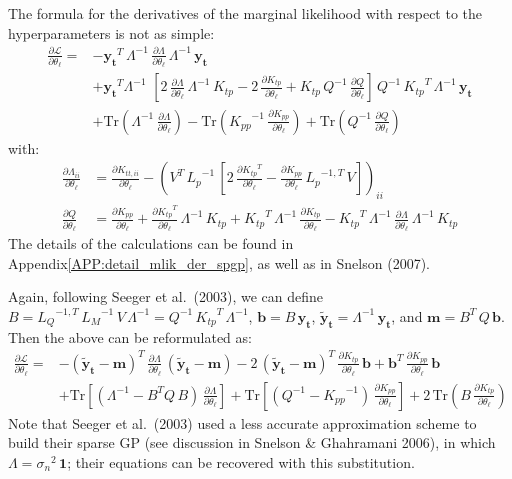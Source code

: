 \documentclass[11pt,a4paper]{article}
\newcommand\rapp[1]{Appendix\;\ref{#1}}
\newcommand{\tr}{\text{Tr}}
\numberwithin{equation}{section}
\begin{document}
The formula for the derivatives of the marginal likelihood with respect to the hyperparameters is not as simple:
\begin{align}
\frac{\partial \mathcal{L}}{\partial \theta_\ell} =
  &-\mathbf{y_t}^T\,\Lambda^{-1}\,\frac{\partial \Lambda}{\partial \theta_\ell}\,\Lambda^{-1}\,\mathbf{y_t} \nonumber \\
  &+\mathbf{y_t}^T\Lambda^{-1}\,\,\left[2\,\frac{\partial \Lambda}{\partial \theta_\ell}\,\Lambda^{-1}\,K_{tp} - 2\,\frac{\partial K_{tp}}{\partial \theta_\ell} + K_{tp}\,Q^{-1}\,\frac{\partial Q}{\partial \theta_\ell}\right]\,Q^{-1}\,{K_{tp}}^T\,\Lambda^{-1}\,\mathbf{y_t} \nonumber \\
  &+\tr\left(\Lambda^{-1}\,\frac{\partial \Lambda}{\partial \theta_\ell}\right) - \tr\left({K_{pp}}^{-1}\,\frac{\partial K_{pp}}{\partial \theta_\ell}\right) + \tr\left(Q^{-1}\,\frac{\partial Q}{\partial \theta_\ell}\right)
\end{align}
with:
\begin{align}
\frac{\partial \Lambda_{ii}}{\partial \theta_\ell} &= \frac{\partial K_{tt,ii}}{\partial \theta_\ell} - \left(V^T\,{L_p}^{-1}\,\left[2\,\frac{\partial {K_{tp}}^T}{\partial \theta_\ell} - \frac{\partial K_{pp}}{\partial \theta_\ell}\,{L_{p}}^{-1,T}\,V\right]\right)_{ii} \\
\frac{\partial Q}{\partial \theta_\ell} &= \frac{\partial K_{pp}}{\partial \theta_\ell} + \frac{\partial {K_{tp}}^T}{\partial \theta_\ell}\,\Lambda^{-1}\,K_{tp} + {K_{tp}}^T\,\Lambda^{-1}\,\frac{\partial K_{tp}}{\partial \theta_\ell} - {K_{tp}}^T\,\Lambda^{-1}\,\frac{\partial \Lambda}{\partial \theta_\ell}\,\Lambda^{-1}\,K_{tp}
\end{align}
The details of the calculations can be found in \rapp{APP:detail_mlik_der_spgp}, as well as in Snelson (2007).

Again, following Seeger et al.~(2003), we can define $B = {L_Q}^{-1,T}\,{L_M}^{-1}\,V\,\Lambda^{-1} = Q^{-1}\,{K_{tp}}^T\,\Lambda^{-1}$, $\mathbf{b} = B\,\mathbf{y_t}$, $\mathbf{\tilde{y}_t} = \Lambda^{-1}\,\mathbf{y_t}$, and $\mathbf{m} = B^T\,Q\,\mathbf{b}$. Then the above can be reformulated as:
\begin{align}
\frac{\partial \mathcal{L}}{\partial \theta_\ell} =
  &-(\mathbf{\tilde{y}_t} - \mathbf{m})^T\,\frac{\partial \Lambda}{\partial \theta_\ell}\,(\mathbf{\tilde{y}_t} - \mathbf{m}) - 2\,(\mathbf{\tilde{y}_t} - \mathbf{m})^T\,\frac{\partial K_{tp}}{\partial \theta_\ell}\,\mathbf{b} + \mathbf{b}^T\,\frac{\partial K_{pp}}{\partial \theta_\ell}\,\mathbf{b} \nonumber \\
  & + \tr\left[\left(\Lambda^{-1} - B^T Q\,B\right)\,\frac{\partial \Lambda}{\partial \theta_\ell}\right] + \tr\left[\left(Q^{-1} - {K_{pp}}^{-1}\right)\,\frac{\partial K_{pp}}{\partial \theta_\ell}\right] + 2\,\tr\left(B\,\frac{\partial K_{tp}}{\partial \theta_\ell}\right)
\end{align}
Note that Seeger et al.~(2003) used a less accurate approximation scheme to build their sparse GP (see discussion in Snelson \& Ghahramani 2006), in which $\Lambda = {\sigma_n}^{2}\,{\bm 1}$; their equations can be recovered with this substitution.
\end{document}
